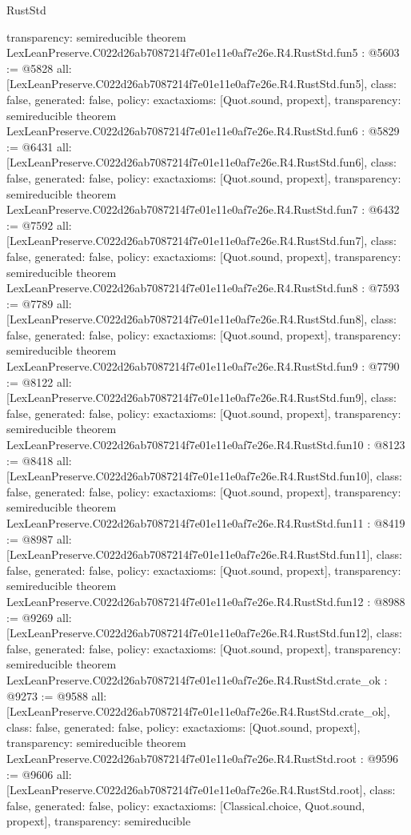 \begin{lexlean}{RustStd}
\begin{coremodule}
{  transparency: semireducible
}
theorem LexLeanPreserve.C022d26ab7087214f7e01e11e0af7e26e.R4.RustStd.fun5 : @5603 := @5828 {
  all: [LexLeanPreserve.C022d26ab7087214f7e01e11e0af7e26e.R4.RustStd.fun5],
  class: false,
  generated: false,
  policy: exact{axioms: [Quot.sound, propext]},
  transparency: semireducible
}
theorem LexLeanPreserve.C022d26ab7087214f7e01e11e0af7e26e.R4.RustStd.fun6 : @5829 := @6431 {
  all: [LexLeanPreserve.C022d26ab7087214f7e01e11e0af7e26e.R4.RustStd.fun6],
  class: false,
  generated: false,
  policy: exact{axioms: [Quot.sound, propext]},
  transparency: semireducible
}
theorem LexLeanPreserve.C022d26ab7087214f7e01e11e0af7e26e.R4.RustStd.fun7 : @6432 := @7592 {
  all: [LexLeanPreserve.C022d26ab7087214f7e01e11e0af7e26e.R4.RustStd.fun7],
  class: false,
  generated: false,
  policy: exact{axioms: [Quot.sound, propext]},
  transparency: semireducible
}
theorem LexLeanPreserve.C022d26ab7087214f7e01e11e0af7e26e.R4.RustStd.fun8 : @7593 := @7789 {
  all: [LexLeanPreserve.C022d26ab7087214f7e01e11e0af7e26e.R4.RustStd.fun8],
  class: false,
  generated: false,
  policy: exact{axioms: [Quot.sound, propext]},
  transparency: semireducible
}
theorem LexLeanPreserve.C022d26ab7087214f7e01e11e0af7e26e.R4.RustStd.fun9 : @7790 := @8122 {
  all: [LexLeanPreserve.C022d26ab7087214f7e01e11e0af7e26e.R4.RustStd.fun9],
  class: false,
  generated: false,
  policy: exact{axioms: [Quot.sound, propext]},
  transparency: semireducible
}
theorem LexLeanPreserve.C022d26ab7087214f7e01e11e0af7e26e.R4.RustStd.fun10 : @8123 := @8418 {
  all: [LexLeanPreserve.C022d26ab7087214f7e01e11e0af7e26e.R4.RustStd.fun10],
  class: false,
  generated: false,
  policy: exact{axioms: [Quot.sound, propext]},
  transparency: semireducible
}
theorem LexLeanPreserve.C022d26ab7087214f7e01e11e0af7e26e.R4.RustStd.fun11 : @8419 := @8987 {
  all: [LexLeanPreserve.C022d26ab7087214f7e01e11e0af7e26e.R4.RustStd.fun11],
  class: false,
  generated: false,
  policy: exact{axioms: [Quot.sound, propext]},
  transparency: semireducible
}
theorem LexLeanPreserve.C022d26ab7087214f7e01e11e0af7e26e.R4.RustStd.fun12 : @8988 := @9269 {
  all: [LexLeanPreserve.C022d26ab7087214f7e01e11e0af7e26e.R4.RustStd.fun12],
  class: false,
  generated: false,
  policy: exact{axioms: [Quot.sound, propext]},
  transparency: semireducible
}
theorem LexLeanPreserve.C022d26ab7087214f7e01e11e0af7e26e.R4.RustStd.crate_ok : @9273 := @9588 {
  all: [LexLeanPreserve.C022d26ab7087214f7e01e11e0af7e26e.R4.RustStd.crate_ok],
  class: false,
  generated: false,
  policy: exact{axioms: [Quot.sound, propext]},
  transparency: semireducible
}
theorem LexLeanPreserve.C022d26ab7087214f7e01e11e0af7e26e.R4.RustStd.root : @9596 := @9606 {
  all: [LexLeanPreserve.C022d26ab7087214f7e01e11e0af7e26e.R4.RustStd.root],
  class: false,
  generated: false,
  policy: exact{axioms: [Classical.choice, Quot.sound, propext]},
  transparency: semireducible
}


\end{coremodule}
\end{lexlean}
